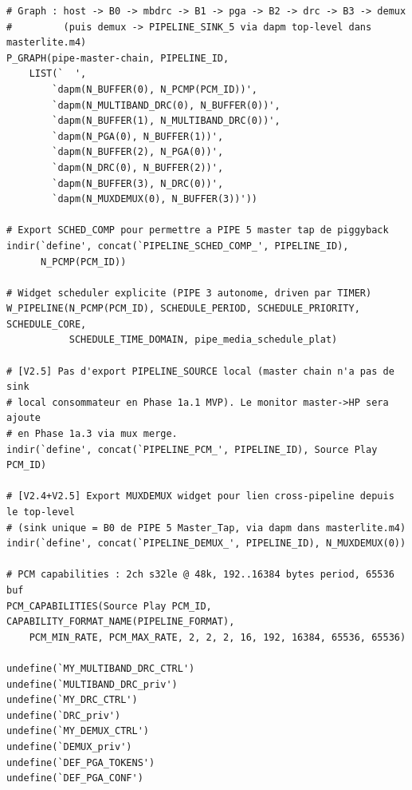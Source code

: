 \documentclass[11pt,a4paper]{article}
\begin{document}
\begin{lstlisting}[language={}, basicstyle=\ttfamily\scriptsize]
# Graph : host -> B0 -> mbdrc -> B1 -> pga -> B2 -> drc -> B3 -> demux
#         (puis demux -> PIPELINE_SINK_5 via dapm top-level dans masterlite.m4)
P_GRAPH(pipe-master-chain, PIPELINE_ID,
    LIST(`  ',
        `dapm(N_BUFFER(0), N_PCMP(PCM_ID))',
        `dapm(N_MULTIBAND_DRC(0), N_BUFFER(0))',
        `dapm(N_BUFFER(1), N_MULTIBAND_DRC(0))',
        `dapm(N_PGA(0), N_BUFFER(1))',
        `dapm(N_BUFFER(2), N_PGA(0))',
        `dapm(N_DRC(0), N_BUFFER(2))',
        `dapm(N_BUFFER(3), N_DRC(0))',
        `dapm(N_MUXDEMUX(0), N_BUFFER(3))'))

# Export SCHED_COMP pour permettre a PIPE 5 master tap de piggyback
indir(`define', concat(`PIPELINE_SCHED_COMP_', PIPELINE_ID),
      N_PCMP(PCM_ID))

# Widget scheduler explicite (PIPE 3 autonome, driven par TIMER)
W_PIPELINE(N_PCMP(PCM_ID), SCHEDULE_PERIOD, SCHEDULE_PRIORITY, SCHEDULE_CORE,
           SCHEDULE_TIME_DOMAIN, pipe_media_schedule_plat)

# [V2.5] Pas d'export PIPELINE_SOURCE local (master chain n'a pas de sink
# local consommateur en Phase 1a.1 MVP). Le monitor master->HP sera ajoute
# en Phase 1a.3 via mux merge.
indir(`define', concat(`PIPELINE_PCM_', PIPELINE_ID), Source Play PCM_ID)

# [V2.4+V2.5] Export MUXDEMUX widget pour lien cross-pipeline depuis le top-level
# (sink unique = B0 de PIPE 5 Master_Tap, via dapm dans masterlite.m4)
indir(`define', concat(`PIPELINE_DEMUX_', PIPELINE_ID), N_MUXDEMUX(0))

# PCM capabilities : 2ch s32le @ 48k, 192..16384 bytes period, 65536 buf
PCM_CAPABILITIES(Source Play PCM_ID, CAPABILITY_FORMAT_NAME(PIPELINE_FORMAT),
    PCM_MIN_RATE, PCM_MAX_RATE, 2, 2, 2, 16, 192, 16384, 65536, 65536)

undefine(`MY_MULTIBAND_DRC_CTRL')
undefine(`MULTIBAND_DRC_priv')
undefine(`MY_DRC_CTRL')
undefine(`DRC_priv')
undefine(`MY_DEMUX_CTRL')
undefine(`DEMUX_priv')
undefine(`DEF_PGA_TOKENS')
undefine(`DEF_PGA_CONF')
\end{lstlisting}
\end{document}
